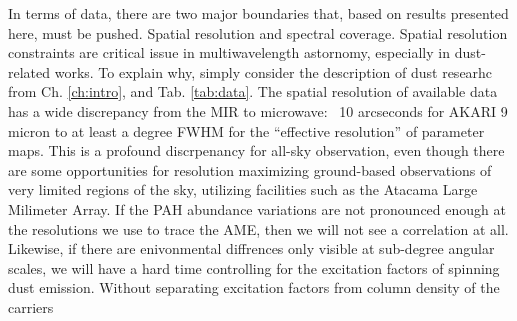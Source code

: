     In terms of data, there are two major boundaries that, based on results presented here, must be pushed. Spatial resolution and spectral coverage.
    Spatial resolution constraints are critical issue in multiwavelength astornomy, especially in dust-related works. To explain why, simply consider the description of dust researhc from Ch. \ref{ch:intro}, and Tab. \ref{tab:data}. The spatial resolution of available data has a wide discrepancy from the MIR to microwave: ~10 arcseconds for AKARI 9 micron to at least a degree FWHM for the ``effective resolution'' of parameter maps. This is a profound discrpenancy for all-sky observation, even though there are some opportunities for resolution maximizing ground-based observations of very limited regions of the sky, utilizing facilities such as the Atacama Large Milimeter Array. If the PAH abundance variations are not pronounced enough at the resolutions we use to trace the AME, then we will not see a correlation at all. Likewise, if there are enivonmental diffrences only visible at sub-degree angular scales, we will have a hard time controlling for the excitation factors of spinning dust emission. Without separating excitation factors from column density of the carriers
